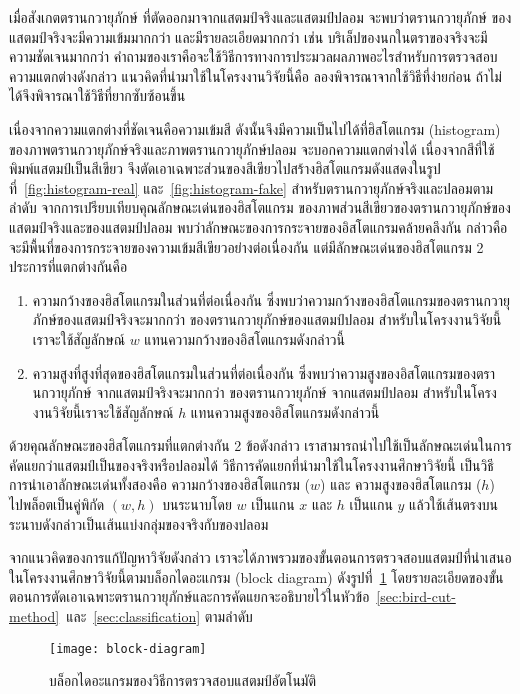 เมื่อสังเกตตรานกวายุภักษ์ ที่ตัดออกมาจากแสตมป์จริงและแสตมป์ปลอม จะพบว่าตรานกวายุภักษ์ ของแสตมป์จริงจะมีความเข้มมากกว่า และมีรายละเอียดมากกว่า เช่น บริเล็ปของนกในตราของจริงจะมีความชัดเจนมากกว่า คำถามของเราคือจะใช้วิธีการทางการประมวลผลภาพอะไรสำหรับการตรวจสอบความแตกต่างดังกล่าว  แนวคิดที่นำมาใช้ในโครงงานวิจัยนี้คือ ลองพิจารณาจากใช้วิธีที่ง่ายก่อน  ถ้าไม่ได้จึงพิจารณาใช้วิธีที่ยากซับซ้อนขึ้น

เนื่องจากความแตกต่างที่ชัดเจนคือความเข้มสี ดังนั้นจึงมีความเป็นไปได้ที่ฮิสโตแกรม (histogram) ของภาพตรานกวายุภักษ์จริงและภาพตรานกวายุภักษ์ปลอม จะบอกความแตกต่างได้  เนื่องจากสีที่ใช้พิมพ์แสตมป์เป็นสีเขียว จึงตัดเอาเฉพาะส่วนของสีเขียวไปสร้างฮิสโตแกรมดังแสดงในรูปที่~\ref{fig:histogram-real} และ~\ref{fig:histogram-fake}  สำหรับตรานกวายุภักษ์จริงและปลอมตามลำดับ จากการเปรียบเทียบคุณลักษณะเด่นของฮิสโตแกรม ของภาพส่วนสีเขียวของตรานกวายุภักษ์ของแสตมป์จริงและของแสตมป์ปลอม  พบว่าลักษณะของการกระจายของอิสโตแกรมคล้ายคลึงกัน กล่าวคือจะมีพื้นที่ของการกระจายของความเข้มสีเขียวอย่างต่อเนื่องกัน แต่มีลักษณะเด่นของฮิสโตแกรม 2 ประการที่แตกต่างกันคือ
\begin{enumerate}
\item ความกว้างของฮิสโตแกรมในส่วนที่ต่อเนื่องกัน ซึ่งพบว่าความกว้างของฮิสโตแกรมของตรานกวายุภักษ์ของแสตมป์จริงจะมากกว่า ของตรานกวายุภักษ์ของแสตมป์ปลอม สำหรับในโครงงานวิจัยนี้เราจะใช้สัญลักษณ์ $w$ แทนความกว้างของอิสโตแกรมดังกล่าวนี้
\item ความสูงที่สูงที่สุดของฮิสโตแกรมในส่วนที่ต่อเนื่องกัน ซึ่งพบว่าความสูงของอิสโตแกรมของตรา
นกวายุภักษ์ จากแสตมป์จริงจะมากกว่า ของตรานกวายุภักษ์ จากแสตมป์ปลอม สำหรับในโครงงานวิจัยนี้เราจะใช้สัญลักษณ์ $h$ แทนความสูงของอิสโตแกรมดังกล่าวนี้
\end{enumerate}

ด้วยคุณลักษณะของฮิสโตแกรมที่แตกต่างกัน 2 ข้อดังกล่าว เราสามารถนำไปใช้เป็นลักษณะเด่นในการคัดแยกว่าแสตมป์เป็นของจริงหรือปลอมได้ วิธีการคัดแยกที่นำมาใช้ในโครงงานศึกษาวิจัยนี้ เป็นวิธีการนำเอาลักษณะเด่นทั้งสองคือ ความกว้างของฮิสโตแกรม ($w$) และ ความสูงของฮิสโตแกรม ($h$) ไปพล็อตเป็นคู่พิกัด $(w, h)$ บนระนาบโดย $w$ เป็นแกน $x$ และ $h$ เป็นแกน $y$ แล้วใช้เส้นตรงบนระนาบดังกล่าวเป็นเส้นแบ่งกลุ่มของจริงกับของปลอม

จากแนวคิดของการแก้ปัญหาวิจัยดังกล่าว เราจะได้ภาพรวมของขั้นตอนการตรวจสอบแสตมป์ที่นำเสนอในโครงงานศึกษาวิจัยนี้ตามบล็อกไดอะแกรม (block diagram) ดังรูปที่~\ref{fig:block-diagram} โดยรายละเอียดของขั้นตอนการตัดเอาเฉพาะตรานกวายุภักษ์และการคัดแยกจะอธิบายไว้ในหัวข้อ~\ref{sec:bird-cut-method}~และ~\ref{sec:classification} ตามลำดับ

\begin{figure}[!ht]
\centering
\texttt{[image: block-diagram]}
\vspace{2em}
\caption{บล็อกไดอะแกรมของวิธีการตรวจสอบแสตมป์อัตโนมัติ}
\label{fig:block-diagram}
\end{figure}



